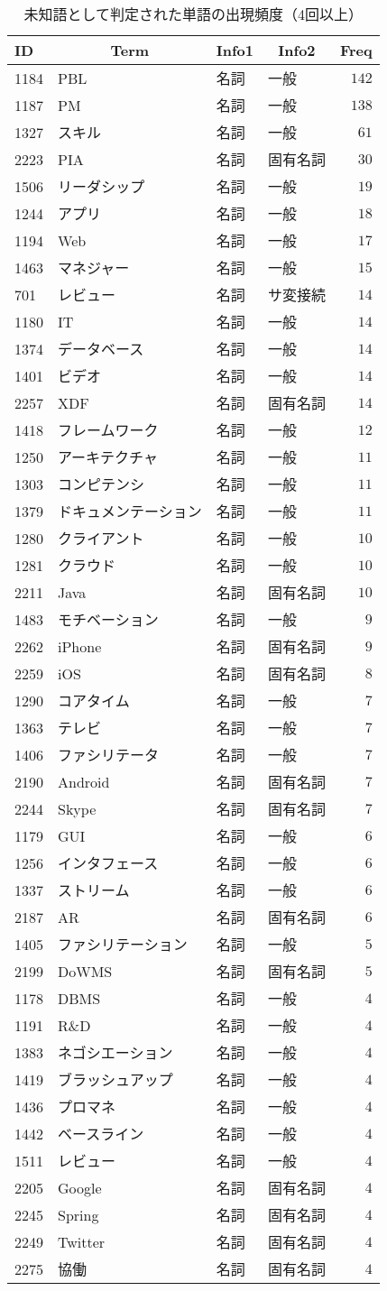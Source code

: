 %
\begin{table}[!tbp]
\caption{未知語として判定された単語の出現頻度（4回以上）\label{tab:未知語頻度結果}} 
\begin{center}
\begin{tabular}{llllr}
\toprule
\multicolumn{1}{l}{ID}&\multicolumn{1}{c}{Term}&\multicolumn{1}{c}{Info1}&\multicolumn{1}{c}{Info2}&\multicolumn{1}{c}{Freq}\tabularnewline
\midrule
1184&PBL&名詞&一般&$142$\tabularnewline
1187&PM&名詞&一般&$138$\tabularnewline
1327&スキル&名詞&一般&$ 61$\tabularnewline
2223&PIA&名詞&固有名詞&$ 30$\tabularnewline
1506&リーダシップ&名詞&一般&$ 19$\tabularnewline
1244&アプリ&名詞&一般&$ 18$\tabularnewline
1194&Web&名詞&一般&$ 17$\tabularnewline
1463&マネジャー&名詞&一般&$ 15$\tabularnewline
701&レビュー&名詞&サ変接続&$ 14$\tabularnewline
1180&IT&名詞&一般&$ 14$\tabularnewline
1374&データベース&名詞&一般&$ 14$\tabularnewline
1401&ビデオ&名詞&一般&$ 14$\tabularnewline
2257&XDF&名詞&固有名詞&$ 14$\tabularnewline
1418&フレームワーク&名詞&一般&$ 12$\tabularnewline
1250&アーキテクチャ&名詞&一般&$ 11$\tabularnewline
1303&コンピテンシ&名詞&一般&$ 11$\tabularnewline
1379&ドキュメンテーション&名詞&一般&$ 11$\tabularnewline
1280&クライアント&名詞&一般&$ 10$\tabularnewline
1281&クラウド&名詞&一般&$ 10$\tabularnewline
2211&Java&名詞&固有名詞&$ 10$\tabularnewline
1483&モチベーション&名詞&一般&$  9$\tabularnewline
2262&iPhone&名詞&固有名詞&$  9$\tabularnewline
2259&iOS&名詞&固有名詞&$  8$\tabularnewline
1290&コアタイム&名詞&一般&$  7$\tabularnewline
1363&テレビ&名詞&一般&$  7$\tabularnewline
1406&ファシリテータ&名詞&一般&$  7$\tabularnewline
2190&Android&名詞&固有名詞&$  7$\tabularnewline
2244&Skype&名詞&固有名詞&$  7$\tabularnewline
1179&GUI&名詞&一般&$  6$\tabularnewline
1256&インタフェース&名詞&一般&$  6$\tabularnewline
1337&ストリーム&名詞&一般&$  6$\tabularnewline
2187&AR&名詞&固有名詞&$  6$\tabularnewline
1405&ファシリテーション&名詞&一般&$  5$\tabularnewline
2199&DoWMS&名詞&固有名詞&$  5$\tabularnewline
1178&DBMS&名詞&一般&$  4$\tabularnewline
1191&R\&D&名詞&一般&$  4$\tabularnewline
1383&ネゴシエーション&名詞&一般&$  4$\tabularnewline
1419&ブラッシュアップ&名詞&一般&$  4$\tabularnewline
1436&プロマネ&名詞&一般&$  4$\tabularnewline
1442&ベースライン&名詞&一般&$  4$\tabularnewline
1511&レビュー&名詞&一般&$  4$\tabularnewline
2205&Google&名詞&固有名詞&$  4$\tabularnewline
2245&Spring&名詞&固有名詞&$  4$\tabularnewline
2249&Twitter&名詞&固有名詞&$  4$\tabularnewline
2275&協働&名詞&固有名詞&$  4$\tabularnewline
\bottomrule
\end{tabular}
\end{center}
\end{table}

